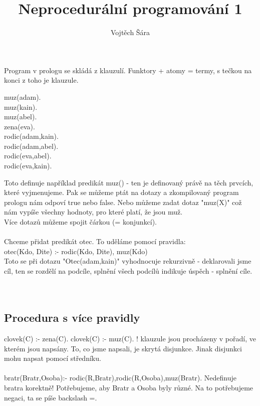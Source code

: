 \documentclass{article}
\title{Neprocedurální programování 1}
\author{Vojtěch Šára}
\begin{document}
\maketitle
Program v prologu se skládá z klauzulí. Funktory + atomy = termy, s tečkou na konci z toho je klauzule.
\begin{center}
    muz(adam).\\
    muz(kain).\\
    muz(abel).\\
    zena(eva).\\
    rodic(adam,kain).\\
    rodic(adam,abel).\\
    rodic(eva,abel).\\
    rodic(eva,kain).\\
\end{center}
Toto definuje například predikát muz() - ten je definovaný právě na těch prvcích, které vyjmenujeme. Pak se můžeme
ptát na dotazy a zkompilovaný program prologu nám odpoví true nebo false. Nebo můžeme zadat dotaz "muz(X)"
což nám vypíše všechny hodnoty, pro které platí, že jsou muž.\\
Více dotazů můžeme spojit čárkou (= konjunkcí).\\\\

Chceme přidat predikát otec. To uděláme pomocí pravidla:\\
otec(Kdo, Dite) :- rodic(Kdo, Dite), muz(Kdo)\\
Toto se při dotazu "Otec(adam,kain)" vyhodnocuje rekurzivně - deklarovali jsme cíl, ten se rozdělí na 
podcíle, splnění všech podcílů indikuje úspěch - splnění cíle. \\\\\

\subsection*{Procedura s více pravidly}
clovek(C) :- zena(C).
clovek(C) :- muz(C).
! klauzule jsou procházeny v pořadí, ve kterém jsou napsány. To, co jsme napsali, je skrytá disjunkce.
Jinak disjunkci mohu napsat pomocí středníku.\\\\

bratr(Bratr,Osoba):- rodic(R,Bratr),rodic(R,Osoba),muz(Bratr). Nedefinuje bratra korektně! Potřebujeme,
aby Bratr a Osoba byly různé. Na to potřebujeme negaci, ta se píše backslash =. \\\\
\end{document}
